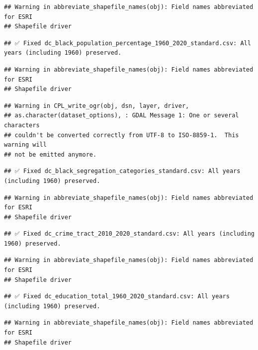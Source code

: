 \documentclass[
]{article}
\begin{document}
\begin{verbatim}
## Warning in abbreviate_shapefile_names(obj): Field names abbreviated for ESRI
## Shapefile driver
\end{verbatim}

\begin{verbatim}
## ✅ Fixed dc_black_population_percentage_1960_2020_standard.csv: All years (including 1960) preserved.
\end{verbatim}

\begin{verbatim}
## Warning in abbreviate_shapefile_names(obj): Field names abbreviated for ESRI
## Shapefile driver
\end{verbatim}

\begin{verbatim}
## Warning in CPL_write_ogr(obj, dsn, layer, driver,
## as.character(dataset_options), : GDAL Message 1: One or several characters
## couldn't be converted correctly from UTF-8 to ISO-8859-1.  This warning will
## not be emitted anymore.
\end{verbatim}

\begin{verbatim}
## ✅ Fixed dc_black_segregation_categories_standard.csv: All years (including 1960) preserved.
\end{verbatim}

\begin{verbatim}
## Warning in abbreviate_shapefile_names(obj): Field names abbreviated for ESRI
## Shapefile driver
\end{verbatim}

\begin{verbatim}
## ✅ Fixed dc_crime_tract_2010_2020_standard.csv: All years (including 1960) preserved.
\end{verbatim}

\begin{verbatim}
## Warning in abbreviate_shapefile_names(obj): Field names abbreviated for ESRI
## Shapefile driver
\end{verbatim}

\begin{verbatim}
## ✅ Fixed dc_education_total_1960_2020_standard.csv: All years (including 1960) preserved.
\end{verbatim}

\begin{verbatim}
## Warning in abbreviate_shapefile_names(obj): Field names abbreviated for ESRI
## Shapefile driver
\end{verbatim}
\end{document}
